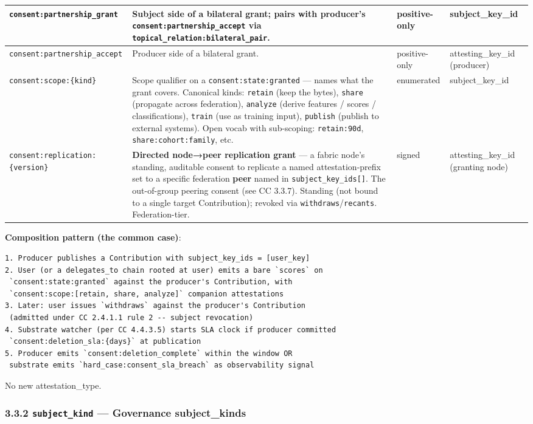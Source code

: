 \documentclass[11pt]{article}
\begin{document}
{\begin{longtable}{|p{4.0cm}|p{4.0cm}|p{4.0cm}|p{4.0cm}|}
\texttt{consent:partnership\_grant} & Subject side of a bilateral grant; pairs with producer's \texttt{consent:partnership\_accept} via \texttt{topical\_relation:bilateral\_pair}. & positive-only & subject\_key\_id \\ \hline
\texttt{consent:partnership\_accept} & Producer side of a bilateral grant. & positive-only & attesting\_key\_id (producer) \\ \hline
\texttt{consent:scope:\{kind\}} & Scope qualifier on a \texttt{consent:state:granted} — names what the grant covers. Canonical kinds: \texttt{retain} (keep the bytes), \texttt{share} (propagate across federation), \texttt{analyze} (derive features / scores / classifications), \texttt{train} (use as training input), \texttt{publish} (publish to external systems). Open vocab with sub-scoping: \texttt{retain:90d}, \texttt{share:cohort:family}, etc. & enumerated & subject\_key\_id \\ \hline
\texttt{consent:replication:\{version\}} & \textbf{Directed node→peer replication grant} — a fabric node's standing, auditable consent to replicate a named attestation-prefix set to a specific federation \textbf{peer} named in \texttt{subject\_key\_ids[]}. The out-of-group peering consent (see CC 3.3.7). Standing (not bound to a single target Contribution); revoked via \texttt{withdraws}/\texttt{recants}. Federation-tier. & signed & attesting\_key\_id (granting node) \\ \hline
\end{longtable}}


\textbf{Composition pattern (the common case)}:


\begin{lstlisting}
1. Producer publishes a Contribution with subject_key_ids = [user_key]
2. User (or a delegates_to chain rooted at user) emits a bare `scores` on
 `consent:state:granted` against the producer's Contribution, with
 `consent:scope:[retain, share, analyze]` companion attestations
3. Later: user issues `withdraws` against the producer's Contribution
 (admitted under CC 2.4.1.1 rule 2 -- subject revocation)
4. Substrate watcher (per CC 4.4.3.5) starts SLA clock if producer committed
 `consent:deletion_sla:{days}` at publication
5. Producer emits `consent:deletion_complete` within the window OR
 substrate emits `hard_case:consent_sla_breach` as observability signal
\end{lstlisting}

No new attestation\_type.


\subsubsection*{3.3.2 \texttt{subject\_kind} — Governance subject\_kinds}
\end{document}
